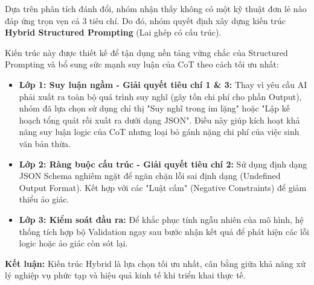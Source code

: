 
Dựa trên phân tích đánh đổi, nhóm nhận thấy không có một kỹ thuật đơn lẻ nào đáp ứng trọn vẹn cả 3 tiêu chí. Do đó, nhóm quyết định xây dựng kiến trúc \textbf{Hybrid Structured Prompting} (Lai ghép có cấu trúc).

Kiến trúc này được thiết kế để tận dụng nền tảng vững chắc của Structured Prompting và bổ sung sức mạnh suy luận của CoT theo cách tối ưu nhất:

\begin{itemize}
    \item \textbf{Lớp 1: Suy luận ngầm - Giải quyết tiêu chí 1 \& 3:} Thay vì yêu cầu AI phải xuất ra toàn bộ quá trình suy nghĩ (gây tốn chi phí cho phần Output), nhóm đã lựa chọn sử dụng chỉ thị "Suy nghĩ trong im lặng" hoặc "Lập kế hoạch tổng quát rồi xuất ra dưới dạng JSON". Điều này giúp kích hoạt khả năng suy luận logic của CoT nhưng loại bỏ gánh nặng chi phí của việc sinh văn bản thừa.
    \item \textbf{Lớp 2: Ràng buộc cấu trúc - Giải quyết tiêu chí 2:} Sử dụng định dạng JSON Schema nghiêm ngặt để ngăn chặn lỗi sai định dạng (Undefined Output Format). Kết hợp với các "Luật cấm" (Negative Constraints) để giảm thiểu ảo giác.
    \item \textbf{Lớp 3: Kiểm soát đầu ra:} Để khắc phục tính ngẫu nhiên của mô hình, hệ thống tích hợp bộ Validation ngay sau bước nhận kết quả để phát hiện các lỗi logic hoặc ảo giác còn sót lại.
\end{itemize}

\textbf{Kết luận:} Kiến trúc Hybrid là lựa chọn tối ưu nhất, cân bằng giữa khả năng xử lý nghiệp vụ phức tạp và hiệu quả kinh tế khi triển khai thực tế.

